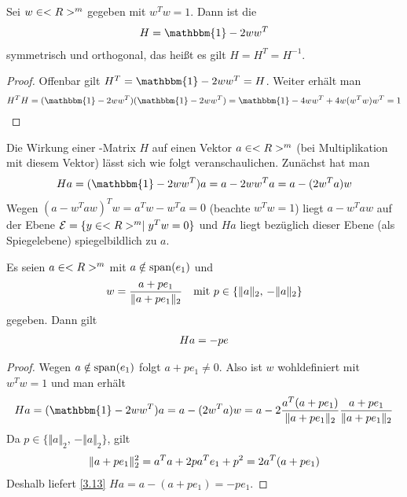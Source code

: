 \begin{proposition}
	Sei $w\in<R>^m$ gegeben mit $w^Tw=1$. Dann ist die 
	\begin{align}
		H = \mathbbm{1} - 2ww^T\notag
	\end{align}
	symmetrisch und orthogonal, das heißt es gilt $H=H^T=H^{-1}$.
\end{proposition}
\begin{proof}
	Offenbar gilt $H^T=\mathbbm{1}-2ww^T=H$. Weiter erhält man
	\begin{align}
		H^TH=(\mathbbm{1}-2ww^T)(\mathbbm{1}-2ww^T) = \mathbbm{1} - 4ww^T + 4w(w^Tw)w^T = 1\notag
	\end{align}
\end{proof}

Die Wirkung einer -Matrix $H$ auf einen Vektor $a\in<R>^m$ (bei Multiplikation mit diesem Vektor) lässt sich wie folgt veranschaulichen. Zunächst hat man
\begin{align}
	Ha=(\mathbbm{1}-2ww^T)a = a-2ww^Ta = a-(2w^Ta)w\notag
\end{align}
Wegen $(a-w^Taw)^Tw=a^Tw-w^Ta=0$ (beachte $w^Tw=1$) liegt $a-w^Taw$ auf der Ebene $\mathcal{E}=\{y\in<R>^m\mid y^Tw=0\}$ und $Ha$ liegt bezüglich dieser Ebene (als Spiegelebene) spiegelbildlich zu $a$.

\begin{proposition}
	Es seien $a\in<R>^m$ mit $a\notin\operatorname{span}(e_1)$ und 
	\begin{align}
		w = \frac{a+pe_1}{\Vert a+pe_1\Vert_2}\quad\text{mit } p\in\{\Vert a\Vert_2,\, -\Vert a\Vert_2\}\notag
	\end{align}
	gegeben. Dann gilt
	\begin{align}
		Ha = -pe\notag
	\end{align}
\end{proposition}
\begin{proof}
	Wegen $a\notin\operatorname{span}(e_1)$ folgt $a+pe_1\neq 0$. Also ist $w$ wohldefiniert mit $w^Tw=1$ und man erhält
	\begin{align}
		\label{3.13}
		Ha = (\mathbbm{1}-2ww^T)a = a-(2w^Ta)w = a-2\frac{a^T(a+pe_1)}{\Vert a+pe_1\Vert_2}\frac{a+pe_1}{\Vert a+pe_1\Vert_2}
	\end{align}
	Da $p\in\{\Vert a\Vert_2,\, -\Vert a\Vert_2\}$, gilt
	\begin{align}
		\Vert a+pe_1\Vert_2^2 = a^Ta+2pa^Te_1+p^2 = 2a^T(a+pe_1)\notag
	\end{align}
	Deshalb liefert \cref{3.13} $Ha = a-(a+pe_1) = -pe_1$.
\end{proof}

